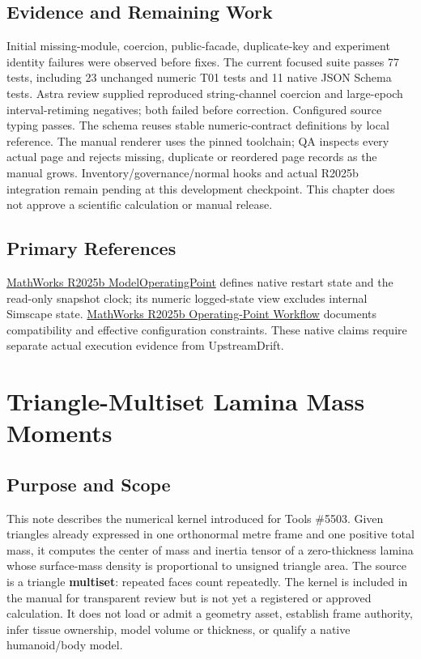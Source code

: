 \documentclass[
  american,
]{article}
\begin{document}
\subsection{Evidence and Remaining
Work}\label{evidence-and-remaining-work}

Initial missing-module, coercion, public-facade, duplicate-key and
experiment identity failures were observed before fixes. The current
focused suite passes 77 tests, including 23 unchanged numeric T01 tests
and 11 native JSON Schema tests. Astra review supplied reproduced
string-channel coercion and large-epoch interval-retiming negatives;
both failed before correction. Configured source typing passes. The
schema reuses stable numeric-contract definitions by local reference.
The manual renderer uses the pinned toolchain; QA inspects every actual
page and rejects missing, duplicate or reordered page records as the
manual grows. Inventory/governance/normal hooks and actual R2025b
integration remain pending at this development checkpoint. This chapter
does not approve a scientific calculation or manual release.

\subsection{Primary References}\label{primary-references}

\href{https://www.mathworks.com/help/releases/R2025b/simulink/slref/simulink.op.modeloperatingpoint.html}{MathWorks
R2025b ModelOperatingPoint} defines native restart state and the
read-only snapshot clock; its numeric logged-state view excludes
internal Simscape state.
\href{https://www.mathworks.com/help/releases/R2025b/simulink/ug/model-operating-point-for-faster-simulation.html}{MathWorks
R2025b Operating-Point Workflow} documents compatibility and effective
configuration constraints. These native claims require separate actual
execution evidence from UpstreamDrift.

\section{Triangle-Multiset Lamina Mass
Moments}\label{triangle-multiset-lamina-mass-moments}

\subsection{Purpose and Scope}\label{purpose-and-scope-1}

This note describes the numerical kernel introduced for Tools \#5503.
Given triangles already expressed in one orthonormal metre frame and one
positive total mass, it computes the center of mass and inertia tensor
of a zero-thickness lamina whose surface-mass density is proportional to
unsigned triangle area. The source is a triangle \textbf{multiset}:
repeated faces count repeatedly. The kernel is included in the manual
for transparent review but is not yet a registered or approved
calculation. It does not load or admit a geometry asset, establish frame
authority, infer tissue ownership, model volume or thickness, or qualify
a native humanoid/body model.
\end{document}

